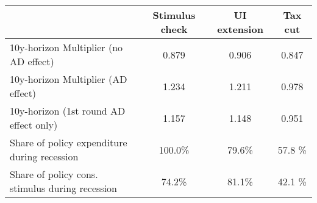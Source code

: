 \begin{tabular}{@{}lccc@{}} 
\toprule 
& Stimulus check    & UI extension    & Tax cut     \\  \midrule 
10y-horizon Multiplier (no AD effect) &0.879  & 0.906  & 0.847     \\ 
10y-horizon Multiplier (AD effect) &1.234  & 1.211  & 0.978     \\ 
10y-horizon (1st round AD effect only) &1.157  & 1.148  & 0.951     \\ 
Share of policy expenditure during recession &100.0\%  & 79.6\%  & 57.8 \%    \\ 
Share of policy cons. stimulus during recession &74.2\%  & 81.1\%  & 42.1 \%    \\ \bottomrule 
\end{tabular}  
